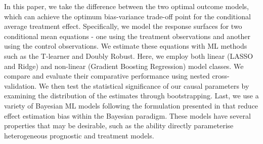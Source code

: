 \documentclass[12pt, a4paper]{article}
\begin{document}
In this paper, we take the difference between the two optimal outcome models, which can achieve the optimum bias-variance trade-off point for the conditional average treatment effect. Specifically, we model the response surfaces for two conditional mean equations - one using the treatment observations and another using the control observations. We estimate these equations with ML methods such as the T-learner and Doubly Robust. Here, we employ both linear (LASSO and Ridge) and non-linear (Gradient Boosting Regression) model classes. We compare and evaluate their comparative performance using nested cross-validation. We then test the statistical significance of our causal parameters by examining the distribution of the estimates through bootstrapping. Last, we use a variety of Bayesian ML models following the formulation presented in \citet{hahn2020} that reduce effect estimation bias within the Bayesian paradigm.
These models have several properties that may be desirable, such as the ability
directly parameterise heterogeneous prognostic and treatment models.
\end{document}
